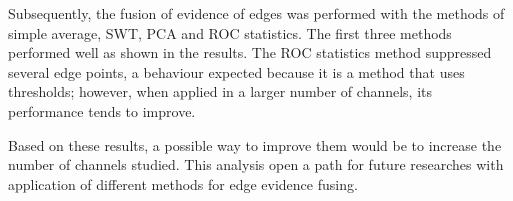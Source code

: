 \documentclass[conference]{IEEEtran}
\begin{document}
Subsequently, the fusion of evidence of edges was performed with the methods of simple average, SWT, PCA and ROC statistics. The first three methods performed well as shown in the results. The ROC statistics method suppressed several edge points, a behaviour expected because it is a method that uses thresholds; however, when applied in a larger number of channels, its performance tends to improve. 

Based on these results, a possible way to improve them would be to increase the number of channels studied. This analysis open a path for future researches with application of different methods for edge evidence fusing.


\end{document}
